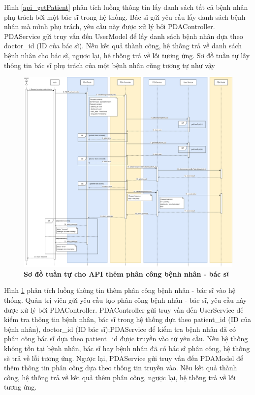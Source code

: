 Hình \ref{api_getPatient} phân tích luồng thông tin lấy danh sách tất cả bệnh nhân phụ trách bởi một bác sĩ trong hệ thống. Bác sĩ gửi yêu cầu lấy danh sách bệnh nhân mà mình phụ trách, 
yêu cầu này được xử lý bởi PDAController. PDAService gửi truy vấn đến UserModel để lấy danh sách bệnh nhân dựa theo doctor\_id (ID của bác sĩ). Nếu kết quả thành công, hệ thống trả về danh sách bệnh nhân cho bác sĩ, ngược lại, hệ thống trả về lỗi tương ứng.
Sơ đồ tuần tự lấy thông tin bác sĩ phụ trách của một bệnh nhân cũng tương tự như vậy
\begin{figure}[H]
  \centering
  \includegraphics[scale=0.3]{Images/sequence_api/addAssignment.png}
  \caption[Sơ đồ tuần tự cho API thêm phân công bệnh nhân - bác sĩ]{\bfseries \fontsize{12pt}{0pt}
  \selectfont Sơ đồ tuần tự cho API thêm phân công bệnh nhân - bác sĩ }
  \label{api_addPDA} %
\end{figure}
Hình \ref{api_addPDA} phân tích luồng thông tin thêm phân công bệnh nhân - bác sĩ vào hệ thống. Quản trị viên gửi yêu cầu tạo phân công bệnh nhân - bác sĩ,  
yêu cầu này được xử lý bởi PDAController. PDAController gửi truy vấn đến UserService để kiểm tra thông tin bệnh nhân, bác sĩ trong hệ thống dựa theo patient\_id (ID của bệnh nhân), doctor\_id (ID bác sĩ);PDAService để kiểm
tra bệnh nhân đã có phân công bác sĩ dựa theo patient\_id được truyền vào từ yêu cầu. Nếu hệ thống không tồn tại bệnh nhân, bác sĩ hay bệnh nhân đã có bác sĩ phân công, hệ thống sẽ trả về lỗi tương ứng. 
Ngược lại, PDAService gửi truy vấn đến PDAModel để thêm thông tin phân công dựa theo thông tin truyền vào. Nếu kết quả thành công, hệ thống trả về kết quả thêm phân công, ngược lại, hệ thống trả về lỗi tương ứng.

